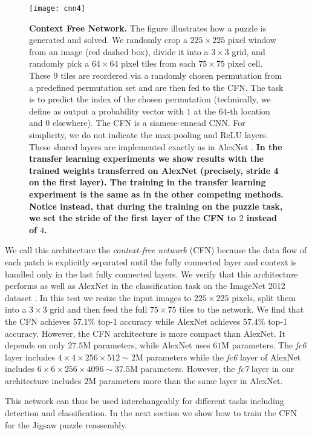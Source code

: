 \documentclass[runningheads]{llncs}
\begin{document}
\begin{figure}[t!]
\centering
\texttt{[image: cnn4]}
 \caption{ \textbf{Context Free Network.} The figure illustrates how a puzzle is generated and solved. We randomly crop a $225\times 225$ pixel window from an image (red dashed box), divide it into a $3\times 3$ grid, and randomly pick a $64\times 64$ pixel tiles from each $75\times 75$ pixel cell. These 9 tiles are reordered via a randomly chosen permutation from a predefined permutation set and are then fed to the CFN. The task is to predict the index of the chosen permutation (technically, we define as output a probability vector with $1$ at the $64$-th location and $0$ elsewhere). The CFN is a siamese-ennead CNN. For simplicity, we do not indicate the max-pooling and ReLU layers. These shared layers are implemented exactly as in AlexNet \cite{KrizhevskyIH12}. \textbf{In the transfer learning experiments we show results with the trained weights transferred on AlexNet (precisely, stride 4 on the first layer). The training in the transfer learning experiment is the same as in the other competing methods. Notice instead, that during the training on the puzzle task, we set the stride of the first layer of the CFN to $2$ instead of $4$.}\label{fig:cnnpuzzle}}
\end{figure}



We call this architecture the \emph{context-free network} (CFN) because the data flow of each patch is explicitly separated until the fully connected layer and context is handled only in the last fully connected layers. We verify that this architecture performs as well as AlexNet in the classification task on the ImageNet 2012 dataset \cite{dengDSLLF09}. In this test we resize the input images to $225\times 225$ pixels, split them into a $3\times 3$ grid and then feed the full $75\times 75$ tiles to the network.
We find that the CFN achieves $57.1\%$ top-1 accuracy while AlexNet achieves $57.4\%$ top-1 accuracy. However, the CFN architecture is more compact than AlexNet. It depends on only $27.5$M parameters, while AlexNet uses $61$M parameters. The \emph{fc6} layer includes $4\times 4 \times 256 \times 512 \sim 2$M parameters while the \emph{fc6} layer of AlexNet includes $6 \times 6 \times 256 \times 4096 \sim 37.5$M  parameters. However,  the \emph{fc7} layer in our architecture includes $2$M parameters more than the same layer in AlexNet.

This network can thus be used interchangeably for different tasks including detection and classification. In the next section we show how to train the CFN for the Jigsaw puzzle reassembly.
\end{document}
